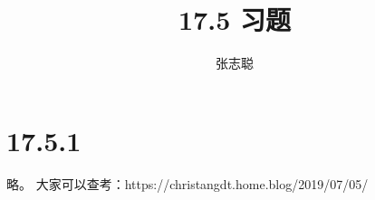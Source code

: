 \documentclass{article}
\begin{document}
\title{17.5 习题}
\author{张志聪}
\maketitle

\section*{17.5.1}


略。
大家可以查考：https://christangdt.home.blog/2019/07/05/%
\end{document}
